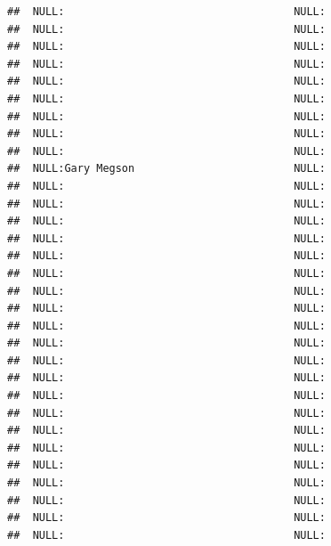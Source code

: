 \documentclass{article}\usepackage[]{graphicx}\usepackage[]{color}
\makeatletter
\newenvironment{kframe}{%
 \def\at@end@of@kframe{}%
 \ifinner\ifhmode%
  \def\at@end@of@kframe{\end{minipage}}%
  \begin{minipage}{\columnwidth}%
 \fi\fi%
 \def\FrameCommand##1{\hskip\@totalleftmargin \hskip-\fboxsep
 \colorbox{shadecolor}{##1}\hskip-\fboxsep
     \hskip-\linewidth \hskip-\@totalleftmargin \hskip\columnwidth}%
 \MakeFramed {\advance\hsize-\width
   \@totalleftmargin\z@ \linewidth\hsize
   \@setminipage}}%
 {\par\unskip\endMakeFramed%
 \at@end@of@kframe}
\newenvironment{knitrout}{}{} %
\makeatother
\begin{document}
\begin{knitrout}
\begin{kframe}
\begin{verbatim}
##  NULL:                                    NULL:                                 
##  NULL:                                    NULL:                                 
##  NULL:                                    NULL:                                 
##  NULL:                                    NULL:                                 
##  NULL:                                    NULL:                                 
##  NULL:                                    NULL:                                 
##  NULL:                                    NULL:                                 
##  NULL:                                    NULL:                                 
##  NULL:                                    NULL:                                 
##  NULL:Gary Megson                         NULL:                                 
##  NULL:                                    NULL:                                 
##  NULL:                                    NULL:                                 
##  NULL:                                    NULL:                                 
##  NULL:                                    NULL:                                 
##  NULL:                                    NULL:                                 
##  NULL:                                    NULL:                                 
##  NULL:                                    NULL:                                 
##  NULL:                                    NULL:                                 
##  NULL:                                    NULL:                                 
##  NULL:                                    NULL:                                 
##  NULL:                                    NULL:                                 
##  NULL:                                    NULL:                                 
##  NULL:                                    NULL:                                 
##  NULL:                                    NULL:                                 
##  NULL:                                    NULL:                                 
##  NULL:                                    NULL:                                 
##  NULL:                                    NULL:                                 
##  NULL:                                    NULL:                                 
##  NULL:                                    NULL:                                 
##  NULL:                                    NULL:                                 
##  NULL:                                    NULL:                                 

\end{verbatim}
\end{kframe}
\end{knitrout}
\end{document}
